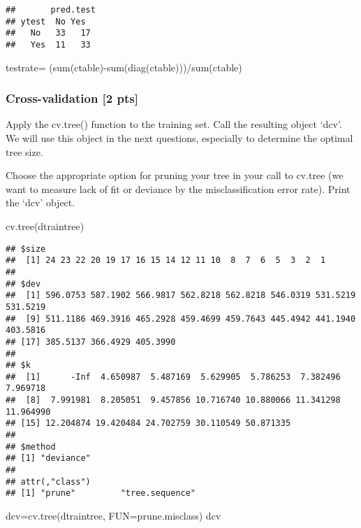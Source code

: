 \documentclass[
]{article}
\newenvironment{Shaded}{\begin{snugshade}}{\end{snugshade}}
\newcommand{\AttributeTok}[1]{\textcolor[rgb]{0.77,0.63,0.00}{#1}}
\newcommand{\FunctionTok}[1]{\textcolor[rgb]{0.00,0.00,0.00}{#1}}
\newcommand{\NormalTok}[1]{#1}
\newcommand{\OtherTok}[1]{\textcolor[rgb]{0.56,0.35,0.01}{#1}}
\newcommand{\SpecialCharTok}[1]{\textcolor[rgb]{0.00,0.00,0.00}{#1}}
\begin{document}
\begin{verbatim}
##       pred.test
## ytest  No Yes 
##   No   33   17
##   Yes  11   33
\end{verbatim}

\begin{Shaded}
\begin{Highlighting}[]
\NormalTok{testrate}\OtherTok{=}\NormalTok{ (}\FunctionTok{sum}\NormalTok{(ctable)}\SpecialCharTok{{-}}\FunctionTok{sum}\NormalTok{(}\FunctionTok{diag}\NormalTok{(ctable)))}\SpecialCharTok{/}\FunctionTok{sum}\NormalTok{(ctable)}
\end{Highlighting}
\end{Shaded}

\hypertarget{cross-validation-2-pts}{%
\subsubsection{Cross-validation {[}2
pts{]}}\label{cross-validation-2-pts}}

Apply the cv.tree() function to the training set. Call the resulting
object `dcv'. We will use this object in the next questions, especially
to determine the optimal tree size.

Choose the appropriate option for pruning your tree in your call to
cv.tree (we want to measure lack of fit or deviance by the
misclassification error rate). Print the `dcv' object.

\begin{Shaded}
\begin{Highlighting}[]
\FunctionTok{cv.tree}\NormalTok{(dtraintree)}
\end{Highlighting}
\end{Shaded}

\begin{verbatim}
## $size
##  [1] 24 23 22 20 19 17 16 15 14 12 11 10  8  7  6  5  3  2  1
## 
## $dev
##  [1] 596.0753 587.1902 566.9817 562.8218 562.8218 546.0319 531.5219 531.5219
##  [9] 511.1186 469.3916 465.2928 459.4699 459.7643 445.4942 441.1940 403.5816
## [17] 385.5137 366.4929 405.3990
## 
## $k
##  [1]      -Inf  4.650987  5.487169  5.629905  5.786253  7.382496  7.969718
##  [8]  7.991981  8.205051  9.457856 10.716740 10.880066 11.341298 11.964990
## [15] 12.204874 19.420484 24.702759 30.110549 50.871335
## 
## $method
## [1] "deviance"
## 
## attr(,"class")
## [1] "prune"         "tree.sequence"
\end{verbatim}

\begin{Shaded}
\begin{Highlighting}[]
\NormalTok{dcv}\OtherTok{=}\FunctionTok{cv.tree}\NormalTok{(dtraintree, }\AttributeTok{FUN=}\NormalTok{prune.misclass)}
\NormalTok{dcv}
\end{Highlighting}
\end{Shaded}
\end{document}
